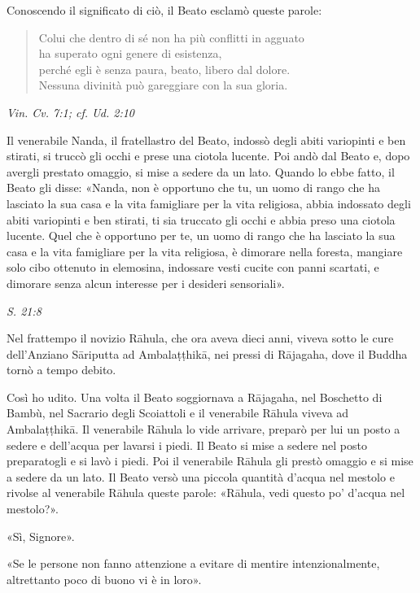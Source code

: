 Conoscendo il significato di ciò, il Beato esclamò queste parole:


\begin{quote}
Colui che dentro di sé non ha più conflitti in agguato \\
ha superato ogni genere di esistenza, \\
perché egli è senza paura, beato, libero dal dolore. \\
Nessuna divinità può gareggiare con la sua gloria.
\end{quote}

\emph{Vin. Cv. 7:1; cf. Ud. 2:10}


 Il venerabile Nanda, il fratellastro del Beato, indossò
degli abiti variopinti e ben stirati, si truccò gli occhi e prese una
ciotola lucente. Poi andò dal Beato e, dopo avergli prestato omaggio, si
mise a sedere da un lato. Quando lo ebbe fatto, il Beato gli disse:
«Nanda, non è opportuno che tu, un uomo di rango che ha lasciato la sua
casa e la vita famigliare per la vita religiosa, abbia indossato degli
abiti variopinti e ben stirati, ti sia truccato gli occhi e abbia preso
una ciotola lucente. Quel che è opportuno per te, un uomo di rango che
ha lasciato la sua casa e la vita famigliare per la vita religiosa, è
dimorare nella foresta, mangiare solo cibo ottenuto in elemosina,
indossare vesti cucite con panni scartati, e dimorare senza alcun
interesse per i desideri sensoriali».


\emph{S. 21:8}


 Nel frattempo il novizio Rāhula, che ora aveva dieci
anni, viveva sotto le cure dell’Anziano Sāriputta ad Ambalaṭṭhikā, nei
pressi di Rājagaha, dove il Buddha tornò a tempo debito.


 Così ho udito. Una volta il Beato soggiornava a Rājagaha,
nel Boschetto di Bambù, nel Sacrario degli Scoiattoli e il venerabile
Rāhula viveva ad Ambalaṭṭhikā. Il venerabile Rāhula lo vide arrivare,
preparò per lui un posto a sedere e dell’acqua per lavarsi i piedi. Il
Beato si mise a sedere nel posto preparatogli e si lavò i piedi. Poi il
venerabile Rāhula gli prestò omaggio e si mise a sedere da un lato. Il
Beato versò una piccola quantità d’acqua nel mestolo e rivolse al
venerabile Rāhula queste parole: «Rāhula, vedi questo po’ d’acqua nel
mestolo?».


«Sì, Signore».


«Se le persone non fanno attenzione a evitare di mentire
intenzionalmente, altrettanto poco di buono vi è in loro».



